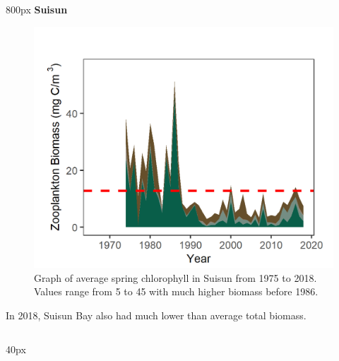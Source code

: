 \documentclass[
]{book}
\begin{document}
\begin{column}{800px\textwidth}
\textbf{Suisun}

\begin{figure}
\includegraphics[width=15.25in]{figures/zoops_ssspring} \caption{Graph of average spring chlorophyll in Suisun from 1975 to 2018. Values range from 5 to 45 with much higher biomass before 1986.}\label{fig:unnamed-chunk-28}
\end{figure}

In 2018, Suisun Bay also had much lower than average total biomass.
\end{column}

\begin{column}{40px\textwidth}
~
\end{column}
\end{document}
